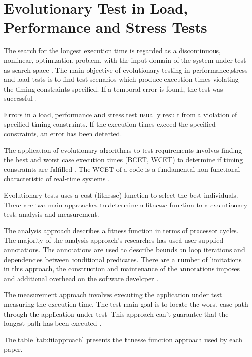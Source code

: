 \section{Evolutionary Test in Load, Performance and Stress Tests}

The search for the longest execution time is regarded as a discontinuous, nonlinear, optimization problem, with the input domain of the system under test as search space \cite{Sullivan}. The main objective of evolutionary testing in performance,stress and load tests is to find test scenarios which produce execution times violating the timing constraints specified. If a temporal error is found, the test was successful \cite{Sullivan}. 
%
%

Errors in a load, performance and stress test usually result from a violation of specified timing constraints. If the execution times exceed the specified constraints, an error has been detected. 

The application of evolutionary algorithms to test requirements involves finding the best and worst case execution times (BCET, WCET) to determine if timing constraints are fulfilled \cite{Afzal2009a}. The WCET of a code is a fundamental non-functional characteristic of real-time systems \cite{tracey2000search}.

Evolutionary tests uses a cost (fitnesse) function to select the best individuals. There are two main approaches to determine a fitnesse function to a evolutionary test: analysis and measurement. 
%
%

The analysis approach describes a fitness function in terms of processor cycles. The majority of the analysis approach's researches has used user supplied annotations. The annotations are used to describe bounds on loop iterations and dependencies between conditional predicates. There are a number of limitations in this approach, the construction and maintenance of the annotations imposes and additional overhead on the software developer \cite{tracey2000search}.

The measurement approach involves executing the application under test measuring the execution time. The test main goal is to locate the worst-case path through the application under test. This approach can't guarantee that the longest path has been executed \cite{tracey2000search}. 

The table \ref{tab:fitapproach} presents the fitnesse function approach used by each paper.

